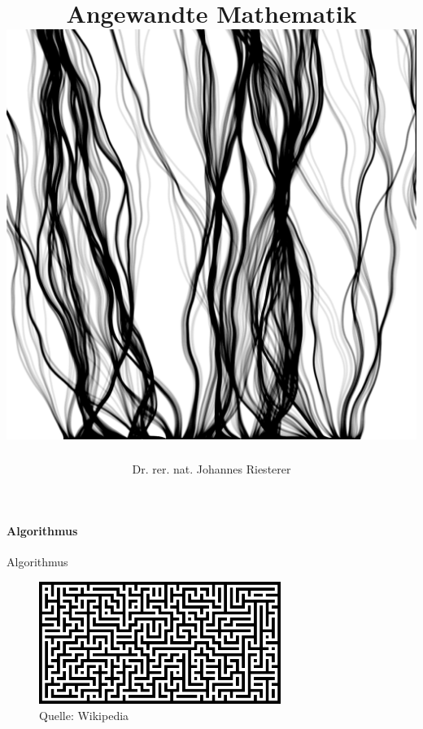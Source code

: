 \documentclass{beamer}
\begin{document}
\title[Angewandte Mathematik] %
{Angewandte Mathematik
\\
\includegraphics[scale=0.15]{images/cover}
}
\subtitle{}
\author[Dr. Johannes Riesterer] %
{Dr.  rer. nat. Johannes Riesterer}

\date[KPT 2004] %
{}

\subject{Angewandte Mathematik}

\frame{\titlepage}


\begin{frame}
\framesubtitle{Algorithmus}
    \begin{block}{Algorithmus}
\begin{figure}[H]
      \centering
    \includegraphics[width=0.7\textwidth]{images/algo}
      \caption{Quelle: Wikipedia}
\end{figure}
\end{block}

 \end{frame}
\end{document}
